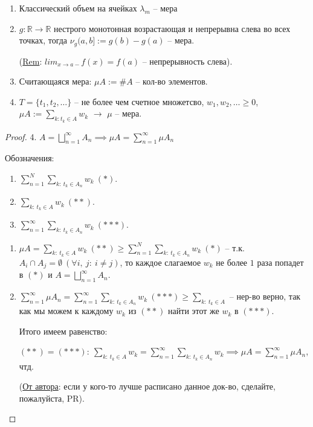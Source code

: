 \begin{example}
    \begin{enumerate}
        \item Классический объем на ячейках $\lambda_m$ -- мера
        \item {
            $g : \mathbb{R} \rightarrow \mathbb{R}$ нестрого монотонная возрастающая и непрерывна слева во всех точках, тогда $\nu_g (a, b]:=g(b) - g(a)$ -- мера.

            (\underline{Rem}: $lim_{x \rightarrow a-} f(x) = f(a)$ -- непрерывность слева).
        }
        \item Считающаяся мера: $\mu A := \#A$ -- кол-во элементов.
        \item $T = \{t_1, t_2, \dots \}$ -- не более чем счетное множетсво, $w_1, w_2, \dots \geq 0$, $\mu A := \sum_{k: t_k \in A} w_k$ $\rightarrow$ $\mu$ -- мера.
    \end{enumerate}
\end{example}

\begin{proof}
    4. $A = \bigsqcup_{n=1}^{\infty} A_n \implies \mu A = \sum_{n=1}^{\infty} \mu A_n$

    Обозначения:

    \begin{enumerate}
        \item $\sum_{n=1}^{N} \sum_{k: \ t_k \in A_n} w_k \ (*)$.
        \item $\sum_{k: \ t_k \in A} w_k \ (**)$.
        \item $\sum_{n=1}^{\infty} \sum_{k: \ t_k \in A_n} w_k \ (***)$.
    \end{enumerate}

    \begin{enumerate}
        \item {
            $\mu A = \sum_{k: \ t_k \in A} w_k \ (**) \geq \sum_{n=1}^{N} \sum_{k: \ t_k \in A_n} w_k \ (*)$ -- т.к. $A_i \cap A_j = \emptyset \ (\forall i, \ j: \ i \neq j)$, то каждое слагаемое $w_k$ не более $1$ раза попадет в $(*)$ и $A = \bigsqcup_{n=1}^{\infty} A_n$.
        }

        \item {
            $\sum_{n=1}^{\infty} \mu A_n = \sum_{n=1}^{\infty} \sum_{k: \ t_k \in A_n} w_k \ (***) \geq \sum_{k: \ t_k \in A}$ -- нер-во верно, так как мы можем к каждому $w_k$ из $(**)$ найти этот же $w_k$ в $(***)$. 
        }

        Итого имеем равенство:

        $(**) = (***): \ \sum_{k: \ t_k \in A} w_k = \sum_{n=1}^{\infty} \sum_{k: \ t_k \in A_n} w_k \implies \mu A = \sum_{n=1}^{\infty} \mu A_n$, чтд.

        (\underline{От автора}: если у кого-то лучше расписано данное док-во, сделайте, пожалуйста, PR).
    \end{enumerate}

\end{proof}
